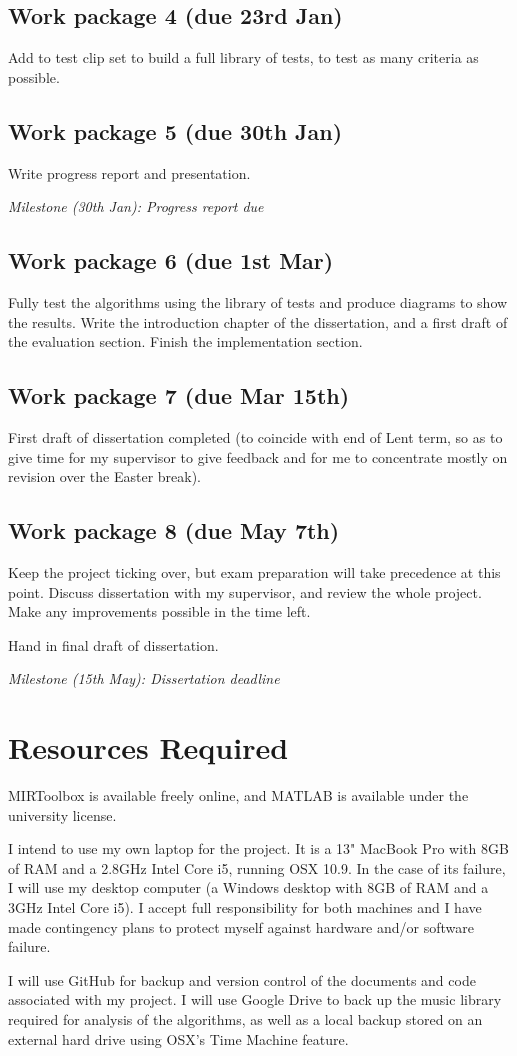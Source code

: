 \documentclass[12pt]{article}
\begin{document}
\subsection*{Work package 4 (due 23rd Jan)}
Add to test clip set to build a full library of tests, to test as many criteria as possible.

\subsection*{Work package 5 (due 30th Jan)}
Write progress report and presentation.

\emph{Milestone (30th Jan): Progress report due}

\subsection*{Work package 6 (due 1st Mar)}
Fully test the algorithms using the library of tests and produce diagrams to show the results. Write the introduction chapter of the dissertation, and a first draft of the evaluation section. Finish the implementation section.

\subsection*{Work package 7 (due Mar 15th)}
First draft of dissertation completed (to coincide with end of Lent term, so as to give time for my supervisor to give feedback and for me to concentrate mostly on revision over the Easter break).

\subsection*{Work package 8 (due May 7th)}
Keep the project ticking over, but exam preparation will take precedence at this point. Discuss dissertation with my supervisor, and review the whole project. Make any improvements possible in the time left.

Hand in final draft of dissertation. 

\emph{Milestone (15th May): Dissertation deadline}


\section*{Resources Required}

 MIRToolbox is available freely online, and MATLAB is available under the university license.

I intend to use my own laptop for the project. It is a 13" MacBook Pro with 8GB of RAM and a 2.8GHz Intel Core i5, running OSX 10.9. In the case of its failure, I will use my desktop computer (a Windows desktop with 8GB of RAM and a 3GHz Intel Core i5). I accept full responsibility for both machines and I have made contingency plans to protect myself against hardware and/or software failure.

I will use GitHub for backup and version control of the documents and code associated with my project. I will use Google Drive to back up the music library required for analysis of the algorithms, as well as a local backup stored on an external hard drive using OSX's Time Machine feature.
\end{document}
